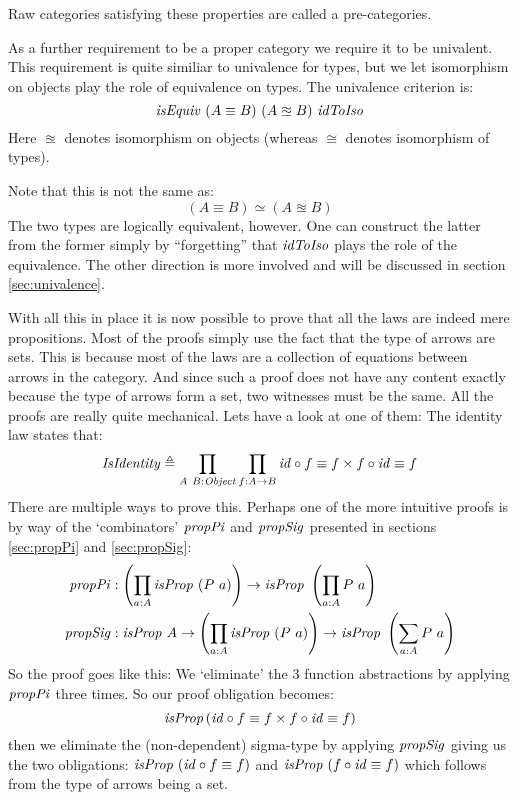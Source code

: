 Raw categories satisfying these properties are called a pre-categories.

As a further requirement to be a proper category we require it to be univalent.
This requirement is quite similiar to univalence for types, but we let
isomorphism on objects play the role of equivalence on types. The univalence
criterion is:
%
$$
\mathit{isEquiv}\ (A \equiv B)\ (A \approxeq B)\ \mathit{idToIso}
$$
%
Here $\approxeq$ denotes isomorphism on objects (whereas $\cong$ denotes
isomorphism of types).

Note that this is not the same as:
%
$$
(A \equiv B) \simeq (A \approxeq B)
$$
%
The two types are logically equivalent, however. One can construct the latter
from the former simply by ``forgetting'' that $\mathit{idToIso}$ plays the role of the
equivalence. The other direction is more involved and will be discussed in
section \ref{sec:univalence}.

With all this in place it is now possible to prove that all the laws are indeed
mere propositions. Most of the proofs simply use the fact that the type of
arrows are sets. This is because most of the laws are a collection of equations
between arrows in the category. And since such a proof does not have any content
exactly because the type of arrows form a set, two witnesses must be the same.
All the proofs are really quite mechanical. Lets have a look at one of them: The
identity law states that:
%
\begin{equation}
  \mathit{IsIdentity} \mathrel{\triangleq}
  \prod_{A\ B \mathrel{:} \mathit{Object}} \prod_{f \mathrel{:} A \to B} \mathit{id} \circ f \equiv f \times f \circ \mathit{id} \equiv f
\end{equation}
%
There are multiple ways to prove this. Perhaps one of the more intuitive proofs
is by way of the `combinators' $\mathit{propPi}$ and $\mathit{propSig}$ presented in sections
\ref{sec:propPi} and \ref{sec:propSig}:
%
\begin{align*}
\mathit{propPi} & \tp \left(\prod_{a \tp A} \isProp\ (P\ a)\right) \to \isProp\ \left(\prod_{a \tp A} P\ a\right)
  \\
\mathit{propSig} & \tp \isProp\ A \to \left(\prod_{a \tp A} \isProp\ (P\ a)\right) \to \isProp\ \left(\sum_{a \tp A} P\ a\right)
\end{align*}
%
So the proof goes like this: We `eliminate' the 3 function abstractions by
applying $\mathit{propPi}$ three times. So our proof obligation becomes:
%
$$
\mathit{isProp} \left( \mathit{id} \circ f \equiv f \times f \circ \mathit{id} \equiv f \right)
$$
%
then we eliminate the (non-dependent) sigma-type by applying $\mathit{propSig}$ giving
us the two obligations: $\mathit{isProp}\ (\mathit{id} \circ f \equiv f)$ and $\mathit{isProp}\ (f \circ
\mathit{id} \equiv f)$ which follows from the type of arrows being a set.

